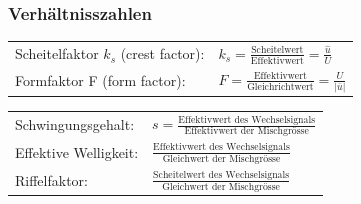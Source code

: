 	\subsubsection{Verhältnisszahlen}
	\begin{multicols}{2}
	\begin{tabular}{ll}
	Scheitelfaktor $k_s$ (crest factor): & $k_s = \frac{\text{Scheitelwert}}{\text{Effektivwert}} = \frac{\hat{u}}{U}$ \\
    Formfaktor F (form factor): & $F = \frac{\text{Effektivwert}}{\text{Gleichrichtwert}} = \frac{U}{|\bar{u}|}$ \\	
	\end{tabular}
	\columnbreak
	
	\begin{tabular}{ll}
	Schwingungsgehalt: & $s = \frac{\text{Effektivwert des Wechselsignals}}{\text{Effektivwert der Mischgr\"osse}}$ \\
	Effektive Welligkeit: & $\frac{\text{Effektivwert des Wechselsignals}}{\text{Gleichwert der Mischgr\"osse}}$ \\
	Riffelfaktor: & $\frac{\text{Scheitelwert des Wechselsignals}}{\text{Gleichwert der Mischgr\"osse}}$ \\
	\end{tabular}
	\end{multicols}

